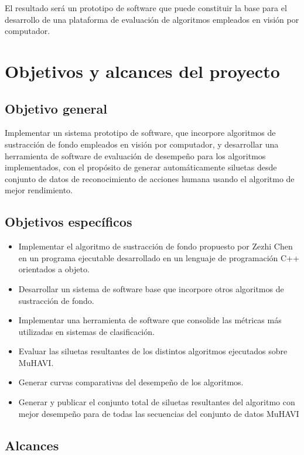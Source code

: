\indent El resultado será un prototipo de software que puede constituir la base para el desarrollo de una plataforma de evaluación de algoritmos empleados en visión por computador.



\section{Objetivos y alcances del proyecto} 
\subsection{Objetivo general}

\indent Implementar un sistema prototipo de software, que incorpore algoritmos de sustracción de fondo empleados en visión por computador, y desarrollar una herramienta de software de evaluación de desempeño para los algoritmos implementados, con el propósito de generar automáticamente siluetas desde conjunto de datos de reconocimiento de acciones humana usando el algoritmo de mejor rendimiento.

\subsection{Objetivos específicos}

\begin{itemize}
\item Implementar el algoritmo de sustracción de fondo propuesto por Zezhi Chen\cite{chen_vehicle_2012} en un programa ejecutable desarrollado en un lenguaje de programación C++ orientados a objeto.
\item Desarrollar un sistema de software base que incorpore otros algoritmos de sustracción de fondo.
\item Implementar una herramienta de software que consolide las métricas más utilizadas en sistemas de clasificación.
\item Evaluar las siluetas resultantes de los distintos algoritmos ejecutados sobre MuHAVI.
\item Generar curvas comparativas del desempeño de los algoritmos.
\item Generar y publicar el conjunto total de siluetas resultantes del algoritmo con mejor desempeño para de todas las secuencias del conjunto de datos MuHAVI 
\end{itemize}


\subsection{Alcances} 

